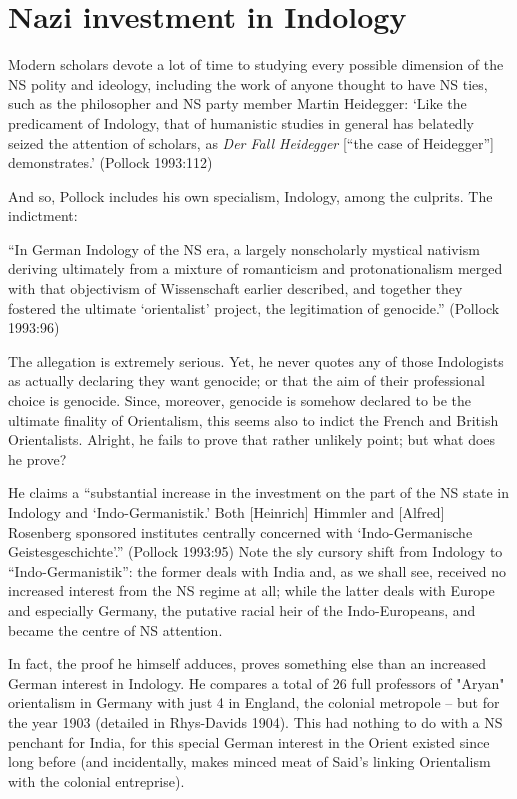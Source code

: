 \section*{Nazi investment in Indology}

Modern scholars devote a lot of time to studying every possible dimension of the NS polity and ideology, including the work of anyone thought to have NS ties, such as the philosopher and NS party member Martin Heidegger: ‘Like the predicament of Indology, that of humanistic studies in general has belatedly seized the attention of scholars, as {\sl Der Fall Heidegger} [“the case of Heidegger”] demonstrates.’ (Pollock 1993:112)

And so, Pollock includes his own specialism, Indology, among the culprits. The indictment:
\begin{myquote}
“In German Indology of the NS era, a largely nonscholarly mystical nativism deriving ultimately from a mixture of romanticism and protonationalism merged with that objectivism of Wissenschaft earlier described, and together they fostered the ultimate ‘orientalist’ project, the legitimation of genocide.” \hfill(Pollock 1993:96)
\end{myquote}

The allegation is extremely serious. Yet, he never quotes any of those Indologists as actually declaring they want genocide; or that the aim of their professional choice is genocide. Since, moreover, genocide is somehow declared to be the ultimate finality of Orientalism, this seems also to indict the French and British Orientalists. Alright, he fails to prove that rather unlikely point; but what does he prove?

He claims a “substantial increase in the investment on the part of the NS state in Indology and ‘Indo-Germanistik.’ Both [Heinrich] Himmler and [Alfred] Rosenberg sponsored institutes centrally concerned with ‘Indo-Germanische Geistesgeschichte’.” (Pollock 1993:95) Note the sly cursory shift from Indology to “Indo-Germanistik”: the former deals with India and, as we shall see, received no increased interest from the NS regime at all; while the latter deals with Europe and especially Germany, the putative racial heir of the Indo-Europeans, and became the centre of NS attention. 
\newpage

In fact, the proof he himself adduces, proves something else than an increased German interest in Indology. He compares a total of 26 full professors of "Aryan" orientalism in Germany with just 4 in England, the colonial metropole – but for the year 1903 (detailed in Rhys-Davids 1904). This had nothing to do with a NS penchant for India, for this special German interest in the Orient existed since long before (and incidentally, makes minced meat of Said’s linking Orientalism with the colonial entreprise).

